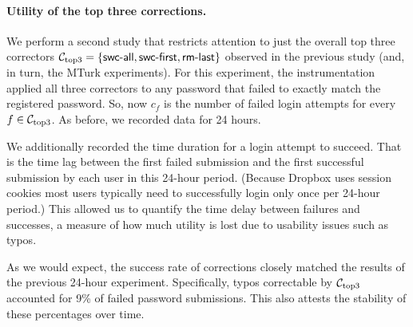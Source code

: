 


\paragraph{Utility of the top three corrections.} We perform a second
study that restricts attention to just the overall top three
correctors ${\mathcal C}_{\textrm{top3}} = \{\textsf{swc-all},\textsf{swc-first},\textsf{rm-last}\}$ observed in the
previous study (and, in turn, the MTurk experiments). For this
experiment, the instrumentation applied all three correctors to any
password that failed to exactly match the registered password. So,
now $c_f$ is the number of failed login attempts for every $f \in {\mathcal C}_{\textrm{top3}}$. %
As before, we recorded data for 24 hours.

We additionally recorded the time duration for a login attempt to
succeed. That is the time lag between the first failed submission and
the first successful submission by each user in this 24-hour
period. (Because Dropbox uses session cookies most users typically
need to successfully login only once per 24-hour period.) This allowed
us to quantify the time delay between failures and successes, a
measure of how much utility is lost due to usability issues such as
typos.

As we would expect, the success rate of corrections closely matched
the results of the previous 24-hour experiment. Specifically, typos correctable
by ${\mathcal C}_{\textrm{top3}}$ accounted for 9\% of failed password submissions. 
This also attests the stability of these percentages over time.

